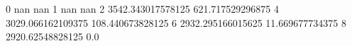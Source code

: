 0 nan nan
1 nan nan
2 3542.343017578125 621.717529296875
4 3029.066162109375 108.440673828125
6 2932.295166015625 11.669677734375
8 2920.62548828125 0.0
